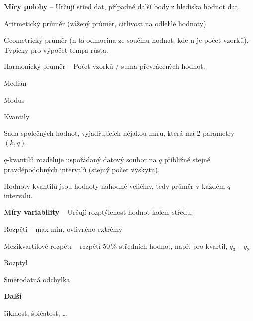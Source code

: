 \begin{compactitem}
    \item \textbf{Míry polohy} -- Určují střed dat, případně další body z hlediska hodnot dat. \begin{compactitem}
        \item Aritmetický průměr (vážený průměr, citlivost na odlehlé hodnoty)

        \item Geometrický průměr (n-tá odmocina ze součinu hodnot, kde n je počet vzorků). Typicky pro výpočet tempa růsta.

        \item Harmonický průměr -- Počet vzorků / suma převrácených hodnot.

        \item Medián

        \item Modus

        \item Kvantily \begin{compactitem}
            \item Sada společných hodnot, vyjadřujících nějakou míru, která má 2 parametry $(k, q)$.
            \item $q$-kvantilů rozděluje uspořádaný datový soubor na $q$ přibližně stejně pravděpodobných intervalů (stejný počet výskytu).
            \item Hodnoty kvantilů jsou hodnoty náhodné veličiny, tedy průměr v každém $q$ intervalu.
        \end{compactitem}
    \end{compactitem}

    \item \textbf{Míry variability} -- Určují rozptýlenost hodnot kolem středu. \begin{compactitem}
        \item Rozpětí -- max-min, ovlivněno extrémy
        \item Mezikvartilové rozpětí -- rozpětí 50\,\% středních hodnot, např. pro kvartil, $q_3$ -- $q_2$
        \item Rozptyl
        \item Směrodatná odchylka
    \end{compactitem}

    \item \textbf{Další} \begin{compactitem}
        \item šikmost, špičatost, \dots
    \end{compactitem}

\end{compactitem}

